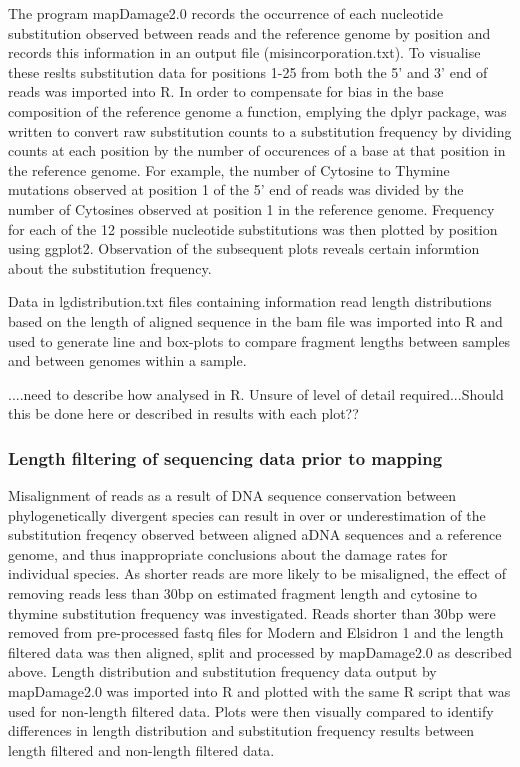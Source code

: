 \documentclass[12pt, a4paper]{article}
\begin{document}
The program mapDamage2.0 records the occurrence of each nucleotide substitution observed between reads and the reference genome by position and records this information in an output file (misincorporation.txt). 
To visualise these reslts substitution data for positions 1-25 from both the 5' and 3' end of reads was imported into R. 
In order to compensate for bias in the base composition of the reference genome a function, emplying the dplyr package, was written to convert raw substitution counts to a substitution frequency by dividing counts at each position by the number of occurences of a base at that position in the reference genome. 
For example, the number of Cytosine to Thymine mutations observed at position 1 of the 5' end of reads was divided by the number of Cytosines observed at position 1 in the reference genome. 
Frequency for each of the 12 possible nucleotide substitutions was then plotted by position using ggplot2. 
Observation of the subsequent plots reveals certain informtion about the substitution frequency.

Data in lgdistribution.txt files containing information read length distributions based on the length of aligned sequence in  the bam file was imported into R and used to generate line and box-plots to compare fragment lengths between samples and between genomes within a sample.

....need to describe how analysed in R. Unsure of level of detail required...Should this be done here or described in results with each plot??

\subsubsection{Length filtering of sequencing data prior to mapping}

Misalignment of reads as a result of DNA sequence conservation between phylogenetically divergent species can result in over or underestimation of the substitution freqency observed between aligned aDNA sequences and a reference genome, and thus inappropriate conclusions about the damage rates for individual species. 
As shorter reads are more likely to be misaligned, the effect of removing reads less than 30bp on estimated fragment length and cytosine to thymine substitution frequency was investigated.
Reads shorter than 30bp were removed from pre-processed fastq files for Modern and Elsidron 1 and the length filtered data was then aligned, split and processed by mapDamage2.0 as described above. 
Length distribution and substitution frequency data output by mapDamage2.0 was imported into R and plotted with the same R script that was used for non-length filtered data. Plots were then visually compared to identify differences in length distribution and substitution frequency results between length filtered and non-length filtered data.
\end{document}
